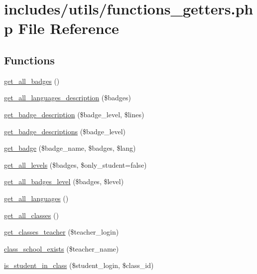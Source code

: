 \hypertarget{functions__getters_8php}{}\section{includes/utils/functions\+\_\+getters.php File Reference}
\label{functions__getters_8php}
\subsection*{Functions}
\begin{DoxyCompactItemize}
\item 
\hyperlink{functions__getters_8php_a8e4b9c0ac59627ef8f3ed4ee586b0542}{get\+\_\+all\+\_\+badges} ()
\item 
\hyperlink{functions__getters_8php_a3cdd298c6d6686cbbc3c2d0510a87eec}{get\+\_\+all\+\_\+languages\+\_\+description} (\$badges)
\item 
\hyperlink{functions__getters_8php_a57e8cb3d87ff5e56ed6d41016b176a57}{get\+\_\+badge\+\_\+description} (\$badge\+\_\+level, \$lines)
\item 
\hyperlink{functions__getters_8php_a7b98f284ce9eccf0745bac524b852d20}{get\+\_\+badge\+\_\+descriptions} (\$badge\+\_\+level)
\item 
\hyperlink{functions__getters_8php_a093235574953d7d977e7145a4a2fe251}{get\+\_\+badge} (\$badge\+\_\+name, \$badges, \$lang)
\item 
\hyperlink{functions__getters_8php_a09f10d63f6129341de45d8fd52fb6afa}{get\+\_\+all\+\_\+levels} (\$badges, \$only\+\_\+student=false)
\item 
\hyperlink{functions__getters_8php_ab8d88d98b70855358641934ab1c74029}{get\+\_\+all\+\_\+badges\+\_\+level} (\$badges, \$level)
\item 
\hyperlink{functions__getters_8php_aba7804caab456cdfd18f0f16c3b46d5d}{get\+\_\+all\+\_\+languages} ()
\item 
\hyperlink{functions__getters_8php_a1d3aea28087a0dfb5fa9b30d3daddadd}{get\+\_\+all\+\_\+classes} ()
\item 
\hyperlink{functions__getters_8php_a1535d2e27e19b7ad8820f6b37c546f60}{get\+\_\+classes\+\_\+teacher} (\$teacher\+\_\+login)
\item 
\hyperlink{functions__getters_8php_a06549af6ed538e2854ac6977399f4736}{class\+\_\+school\+\_\+exists} (\$teacher\+\_\+name)
\item 
\hyperlink{functions__getters_8php_ad7b9531b5adf7e3fd2fbbdabc9e15ebb}{is\+\_\+student\+\_\+in\+\_\+class} (\$student\+\_\+login, \$class\+\_\+id)
\end{DoxyCompactItemize}


